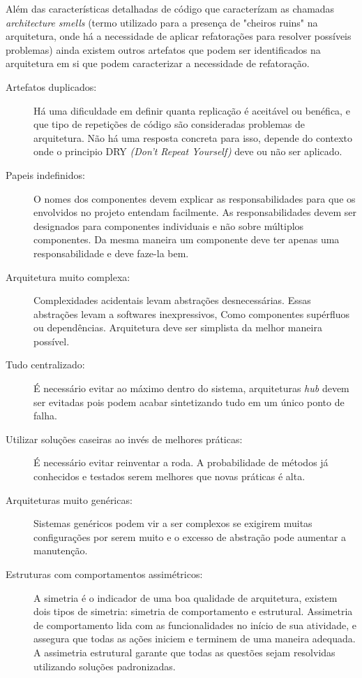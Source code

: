 Além das características detalhadas de código que caracterízam as chamadas \textit{architecture smells} (termo utilizado para a presença de "cheiros ruins" na arquitetura, onde há a necessidade de aplicar refatorações para resolver possíveis problemas) ainda existem outros artefatos que podem ser identificados na arquitetura em si que podem caracterizar a necessidade de refatoração.

\begin{description}

\item[Artefatos duplicados:] Há uma dificuldade em definir quanta replicação é aceitável ou benéfica, e que tipo de repetições de código são consideradas problemas de arquitetura. Não há uma resposta concreta para isso, depende do contexto onde o principio DRY \textit{(Don't Repeat Yourself)} deve ou não ser aplicado.

\item[Papeis indefinidos:] O nomes dos componentes devem explicar as responsabilidades para que os envolvidos no projeto entendam facilmente. As responsabilidades devem ser designados para componentes individuais e não sobre múltiplos componentes. Da mesma maneira um componente deve ter apenas uma responsabilidade e deve faze-la bem.

\item[Arquitetura muito complexa:] Complexidades acidentais levam abstrações desnecessárias. Essas abstrações levam a softwares inexpressivos, Como componentes supérfluos ou dependências. Arquitetura deve ser simplista da melhor maneira possível.

\item[Tudo centralizado:] É necessário evitar ao máximo dentro do sistema, arquiteturas \textit{hub} devem ser evitadas pois podem acabar sintetizando tudo em um único ponto de falha.

\item[Utilizar soluções caseiras ao invés de melhores práticas:] É necessário evitar reinventar a roda. A probabilidade de métodos já conhecidos e testados serem melhores que novas práticas é alta.

\item[Arquiteturas muito genéricas:] Sistemas genéricos podem vir a ser complexos se exigirem muitas configurações por serem muito e o excesso de abstração pode aumentar a manutenção.

\item[Estruturas com comportamentos assimétricos:]
A simetria é o indicador de uma boa qualidade de arquitetura, existem dois tipos de simetria: simetria de comportamento e estrutural. Assimetria de comportamento lida com as funcionalidades no início de sua atividade, e assegura que todas as ações iniciem e terminem de uma maneira adequada. A assimetria estrutural garante que todas as questões sejam resolvidas utilizando soluções padronizadas.


\end{description}
